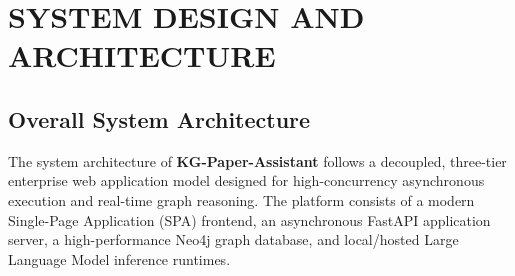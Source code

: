 \chapter{SYSTEM DESIGN AND ARCHITECTURE}

\section{Overall System Architecture}
The system architecture of \textbf{KG-Paper-Assistant} follows a decoupled, three-tier enterprise web application model designed for high-concurrency asynchronous execution and real-time graph reasoning. The platform consists of a modern Single-Page Application (SPA) frontend, an asynchronous FastAPI application server, a high-performance Neo4j graph database, and local/hosted Large Language Model inference runtimes.

